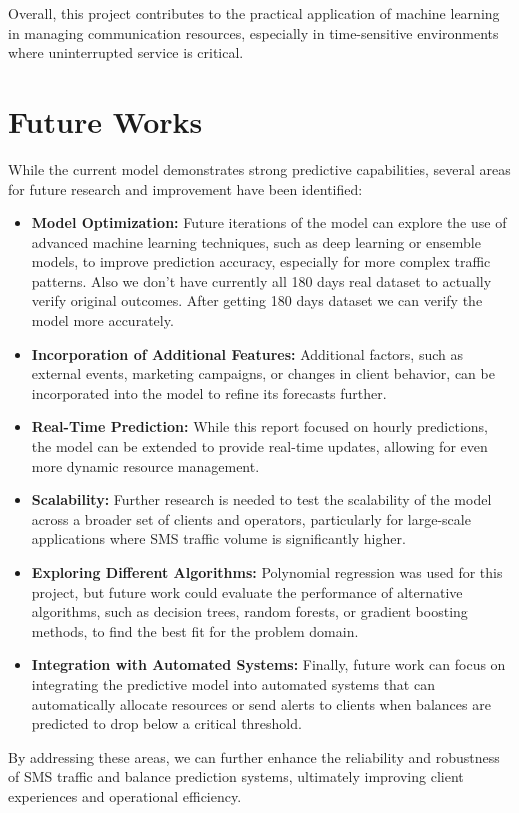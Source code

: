 \documentclass[12pt]{book} %
\begin{document}
Overall, this project contributes to the practical application of machine learning in managing communication resources, especially in time-sensitive environments where uninterrupted service is critical.


\section{Future Works}

While the current model demonstrates strong predictive capabilities, several areas for future research and improvement have been identified:

\begin{itemize}
    
    \item \textbf{Model Optimization:} Future iterations of the model can explore the use of advanced machine learning techniques, such as deep learning or ensemble models, to improve prediction accuracy, especially for more complex traffic patterns. Also we don't have currently all 180 days real dataset to actually verify original outcomes. After getting 180 days dataset we can verify the model more accurately.
    \item \textbf{Incorporation of Additional Features:} Additional factors, such as external events, marketing campaigns, or changes in client behavior, can be incorporated into the model to refine its forecasts further.
    \item \textbf{Real-Time Prediction:} While this report focused on hourly predictions, the model can be extended to provide real-time updates, allowing for even more dynamic resource management.
    \item \textbf{Scalability:} Further research is needed to test the scalability of the model across a broader set of clients and operators, particularly for large-scale applications where SMS traffic volume is significantly higher.
    \item \textbf{Exploring Different Algorithms:} Polynomial regression was used for this project, but future work could evaluate the performance of alternative algorithms, such as decision trees, random forests, or gradient boosting methods, to find the best fit for the problem domain.
    \item \textbf{Integration with Automated Systems:} Finally, future work can focus on integrating the predictive model into automated systems that can automatically allocate resources or send alerts to clients when balances are predicted to drop below a critical threshold.
\end{itemize}

By addressing these areas, we can further enhance the reliability and robustness of SMS traffic and balance prediction systems, ultimately improving client experiences and operational efficiency.
\end{document}
